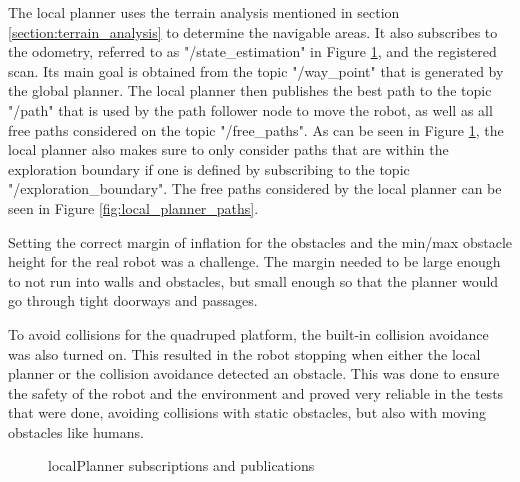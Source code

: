 \documentclass[12pt]{article}
\begin{document}
        The local planner uses the terrain analysis mentioned in section \ref{section:terrain_analysis} to determine the navigable areas. It also subscribes to the odometry, referred to as "/state\_estimation" in Figure \ref{fig:local_planner}, and the registered scan. Its main goal is obtained from the topic "/way\_point" that is generated by the global planner. The local planner then publishes the best path to the topic "/path" that is used by the path follower node to move the robot, as well as all free paths considered on the topic "/free\_paths". As can be seen in Figure \ref{fig:local_planner}, the local planner also makes sure to only consider paths that are within the exploration boundary if one is defined by subscribing to the topic "/exploration\_boundary". The free paths considered by the local planner can be seen in Figure \ref{fig:local_planner_paths}.

        Setting the correct margin of inflation for the obstacles and the min/max obstacle height for the real robot was a challenge. The margin needed to be large enough to not run into walls and obstacles, but small enough so that the planner would go through tight doorways and passages. 

        To avoid collisions for the quadruped platform, the built-in collision avoidance was also turned on. This resulted in the robot stopping when either the local planner or the collision avoidance detected an obstacle. This was done to ensure the safety of the robot and the environment and proved very reliable in the tests that were done, avoiding collisions with static obstacles, but also with moving obstacles like humans.
        
        \begin{figure}[h]
            \centering
            \resizebox{0.6\textwidth}{!}{%
            
            }   
            \caption{localPlanner subscriptions and publications}
            \label{fig:local_planner}
        \end{figure}
        
\end{document}
